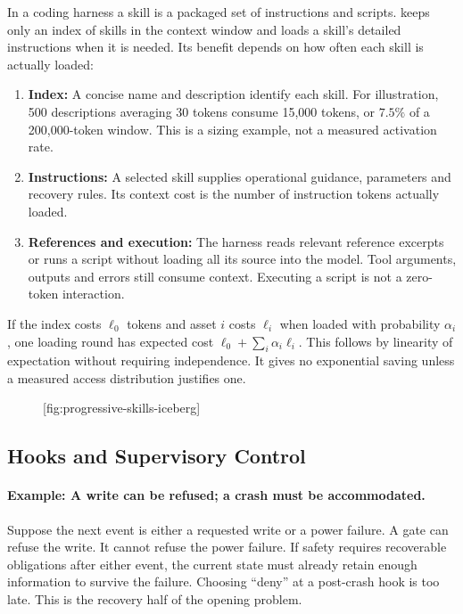 In a coding harness a skill is a packaged set of instructions and scripts.  keeps only an index of skills in the context window and loads a skill's detailed instructions when it is needed. Its benefit depends on how often each skill is actually loaded:
\begin{enumerate}[leftmargin=1.8em,itemsep=3pt]
  \item \textbf{Index:} A concise name and description identify each skill. For illustration, 500 descriptions averaging 30 tokens consume 15,000 tokens, or $7.5\%$ of a 200,000-token window. This is a sizing example, not a measured activation rate.
  \item \textbf{Instructions:} A selected skill supplies operational guidance, parameters and recovery rules. Its context cost is the number of instruction tokens actually loaded.
  \item \textbf{References and execution:} The harness reads relevant reference excerpts or runs a script without loading all its source into the model. Tool arguments, outputs and errors still consume context. Executing a script is not a zero-token interaction.
\end{enumerate}
If the index costs $\ell_0$ tokens and asset $i$ costs $\ell_i$ when loaded with probability $\alpha_i$, one loading round has expected cost $\ell_0+\sum_i \alpha_i \ell_i$. This follows by linearity of expectation without requiring independence. It gives no exponential saving unless a measured access distribution justifies one.

\begin{figure}[tp]
  \centering
  [fig:progressive-skills-iceberg]
\end{figure}


\subsection{Hooks and Supervisory Control}\label{sec:prereq-supervisory}

\paragraph{Example: A write can be refused; a crash must be accommodated.}
Suppose the next event is either a requested write or a power failure. A gate
can refuse the write. It cannot refuse the power failure. If safety requires
recoverable obligations after either event, the current state must already
retain enough information to survive the failure. Choosing ``deny'' at a
post-crash hook is too late. This is the recovery half of the opening problem.


